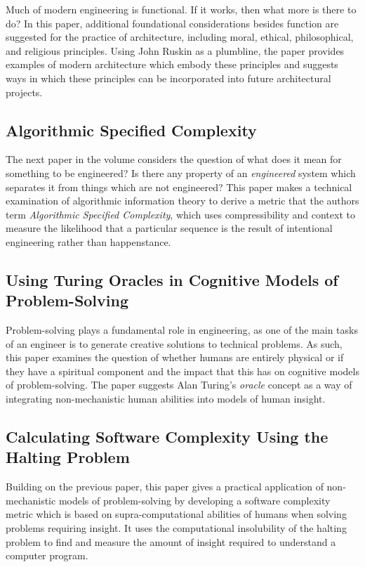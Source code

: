 Much of modern engineering is functional.  If it works, then what more is there to do?  
In this paper, additional foundational considerations besides function are suggested
for the practice of architecture, including moral, ethical, philosophical, and religious
principles.  Using John Ruskin as a plumbline, the paper provides examples of modern 
architecture which embody these principles and suggests ways in which these principles
can be incorporated into future architectural projects.

\subsection*{Algorithmic Specified Complexity}

The next paper in the volume considers the question of what does it mean for something
to be engineered?  Is there any property of an \emph{engineered} system which separates
it from things which are not engineered?  This paper makes a technical examination of 
algorithmic information theory to derive a metric that the authors term
\emph{Algorithmic Specified Complexity}, which uses compressibility and context to 
measure the likelihood that a particular sequence is the result of intentional engineering rather
than happenstance.

\subsection*{Using Turing Oracles in Cognitive Models of Problem-Solving}

Problem-solving plays a fundamental role in engineering, as one of the main tasks of an engineer
is to generate creative solutions to technical problems.  As such, this paper examines 
the question of whether humans are entirely physical or if they have
a spiritual component and the impact that this has on cognitive models of problem-solving.  The
paper suggests Alan Turing's \emph{oracle} concept as a way of integrating non-mechanistic human
abilities into models of human insight.

\subsection*{Calculating Software Complexity Using the Halting Problem}

Building on the previous paper, this paper gives a practical application of non-mechanistic
models of problem-solving by developing a software complexity metric which is based on 
supra-computational abilities of humans when solving problems requiring insight.  It uses
the computational insolubility of the halting problem to find and measure the amount of 
insight required to understand a computer program.

